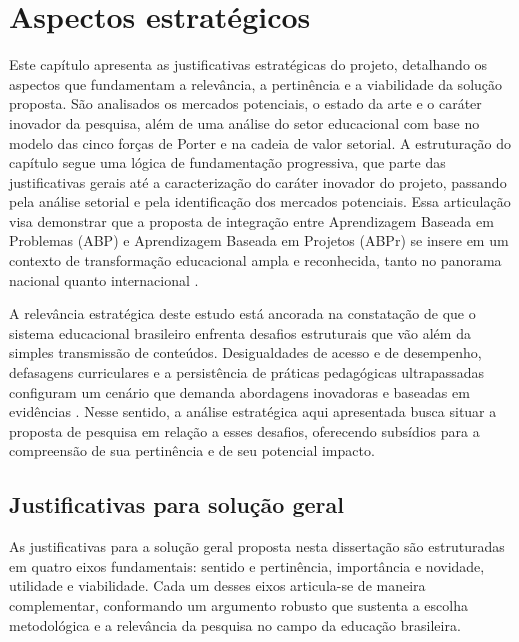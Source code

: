 
\chapter{Aspectos estratégicos}
\label{chap:aspectos_estrategicos}

Este capítulo apresenta as justificativas estratégicas do projeto, detalhando os aspectos que fundamentam a relevância, a pertinência e a viabilidade da solução proposta. São analisados os mercados potenciais, o estado da arte e o caráter inovador da pesquisa, além de uma análise do setor educacional com base no modelo das cinco forças de Porter e na cadeia de valor setorial. A estruturação do capítulo segue uma lógica de fundamentação progressiva, que parte das justificativas gerais até a caracterização do caráter inovador do projeto, passando pela análise setorial e pela identificação dos mercados potenciais. Essa articulação visa demonstrar que a proposta de integração entre Aprendizagem Baseada em Problemas (ABP) e Aprendizagem Baseada em Projetos (ABPr) se insere em um contexto de transformação educacional ampla e reconhecida, tanto no panorama nacional quanto internacional \cite{BACICH2018}.

A relevância estratégica deste estudo está ancorada na constatação de que o sistema educacional brasileiro enfrenta desafios estruturais que vão além da simples transmissão de conteúdos. Desigualdades de acesso e de desempenho, defasagens curriculares e a persistência de práticas pedagógicas ultrapassadas configuram um cenário que demanda abordagens inovadoras e baseadas em evidências \cite{MENEZES2020}. Nesse sentido, a análise estratégica aqui apresentada busca situar a proposta de pesquisa em relação a esses desafios, oferecendo subsídios para a compreensão de sua pertinência e de seu potencial impacto.

\section{Justificativas para solução geral}
\label{sec:justificativa_geral}

As justificativas para a solução geral proposta nesta dissertação são estruturadas em quatro eixos fundamentais: sentido e pertinência, importância e novidade, utilidade e viabilidade. Cada um desses eixos articula-se de maneira complementar, conformando um argumento robusto que sustenta a escolha metodológica e a relevância da pesquisa no campo da educação brasileira.

